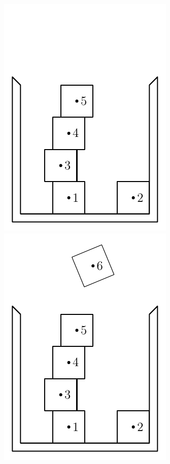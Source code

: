 \documentclass[12pt, sumlimits, intlimits]{article}
\begin{document}
\begin{figure}
\centering
\def \w{0.25\columnwidth}
\includegraphics[width=\w]{btr-0}%
\includegraphics[width=\w]{btr-1}%

\end{figure}
\end{document}
